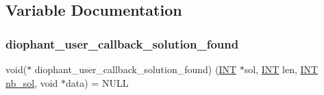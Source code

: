 \subsection{Variable Documentation}
\mbox{\label{diophant_8_c_a24aee7f8771e22c0abcbd30c80ffa6df}} 
\subsubsection{\texorpdfstring{diophant\+\_\+user\+\_\+callback\+\_\+solution\+\_\+found}{diophant\_user\_callback\_solution\_found}}
{\footnotesize\ttfamily void($\ast$ diophant\+\_\+user\+\_\+callback\+\_\+solution\+\_\+found) (\mbox{\hyperlink{galois_8h_a09fddde158a3a20bd2dcadb609de11dc}{I\+NT}} $\ast$sol, \mbox{\hyperlink{galois_8h_a09fddde158a3a20bd2dcadb609de11dc}{I\+NT}} len, \mbox{\hyperlink{galois_8h_a09fddde158a3a20bd2dcadb609de11dc}{I\+NT}} \mbox{\hyperlink{plane__search_8_c_a0029b734487624c93c3a72d74a8f2bf9}{nb\+\_\+sol}}, void $\ast$data) = N\+U\+LL}

